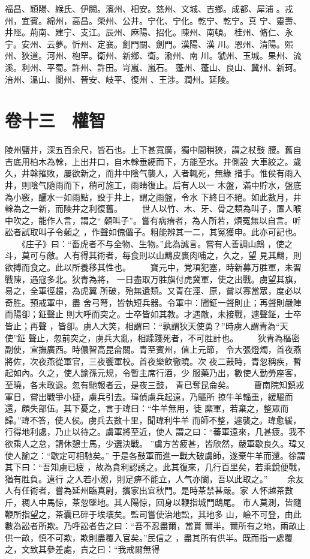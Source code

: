 \documentclass{ctexart}
\begin{document}
福昌、穎陽、緱氏、伊闕。濱州、相安。慈州、文城、吉鄉。成都、犀浦 。戎州，宜賓。綿州，高昌。榮州、公井。宁化、宁化。乾宁、乾宁。真 宁、靈壽、井陘。荊南、建宁、支江。辰州、麻陽、招化。陳州、南頓。 桂州、脩仁、永宁。安州、云夢。忻州、定襄。劍門關、劍門。漢陽、漢 川。恩州、清陽。熙州、狄道。河州、枹罕。衛州、新鄉、衛。渝州、南 川。虢州、玉城。果州、流溪。利州、平蜀。許州、許田。岢嵐、嵐石。 蓬州、蓬山、良山、冀州、新珂。涪州、溫山、閬州、晉安、岐平、復州 、王涉。潤州。延陵。
\clearpage
\section{卷十三　權智}
\paragraph{}
陵州鹽井，深五百余尺，皆石也。上下甚寬廣，獨中間稍狹，謂之杖鼓 腰。舊自吉底用柏木為榦，上出井口，自木榦垂綆而下，方能至水。井側設 大車絞之。歲久，井榦摧敗，屢欲新之，而井中陰气襲人，入者輒死，無緣 措手。惟侯有雨入井，則陰气隨雨而下，稍可施工，雨睛復止。后有人以一 木盤，滿中貯水，盤底為小竅，釃水一如雨點，設于井上，謂之雨盤，令水 下終日不絕。如此數月，井榦為之一新，而陵井之利復舊。 　　世人以竹、木、牙、骨之類為叫子，置人喉中吹之，能作人言，謂之`` 顙叫子''。嘗有病瘖者，為人所若，煩冤無以自言。听訟者試取叫子令顙之 ，作聲如傀儡子。粗能辨其一二，其冤獲申。此亦可記也。 　　《庄子》曰：``畜虎者不与全物、生物。''此為誠言。嘗有人善調山鷓 ，使之斗，莫可与敵。人有得其術者，每食則以山鷓皮裹肉哺之，久之，望 見其鷓，則欲搏而食之。此以所養移其性也。 　　寶元中，党項犯塞，時新募万胜軍，未習戰陳，遇寇多北。狄青為將， 一日盡取万胜旗付虎冀軍，使之出戰。虜望其旗，易之，全軍徑趨，為虎翼 所破，殆無遺類。又青在涇、原，嘗以寡當眾，度必以奇胜。預戒軍中，盡 舍弓弩，皆執短兵器。令軍中：聞鉦一聲則止；再聲則嚴陣而陽卻；鉦聲止 則大呼而突之。士卒皆如其教。才遇敵，未接戰，遽聲鉦，士卒皆止；再聲 ，皆卻。虜人大笑，相謂曰：``孰謂狄天使勇？''時虜人謂青為``天使''鉦 聲止，忽前突之，虜兵大亂，相蹂踐死者，不可胜計也。 　　狄青為樞密副使，宣撫廣西。時儂智高昆侖關。青至賓州，值上元節， 令大張燈燭，首夜燕將佐，次夜燕從軍官，三夜饗軍校。首夜樂飲徹曉。次 夜二鼓時，青忽稱疾，暫起如內。久之，使人諭孫元規，令暫主席行酒，少 服藥乃出，數使人勤勞座客，至曉，各未敢退。忽有馳報者云，是夜三鼓， 青已奪昆侖矣。 　　曹南院知鎮戎軍日，嘗出戰爭小捷，虜兵引去。瑋偵虜兵起遠，乃驅所 掠牛羊輜重，緩驅而還，頗失部伍。其下憂之，言于瑋曰：``牛羊無用，徒 縻軍，若棄之，整眾而歸。''瑋不答，使人侯。虜兵去數十里，聞瑋利牛羊 而師不整，遽襲之。瑋愈緩，行得地利處，乃止以待之。虜軍將至近，使人 謂之曰：``蕃軍遠來，几甚疲。我不欲乘人之怠，請休憩士馬，少選決戰。 ''虜方苦疲甚，皆欣然，嚴軍歇良久。瑋又使人諭之：``歇定可相馳矣。'' 于是各鼓軍而進一戰大破虜師，遂棄牛羊而還。徐謂其下曰：``吾知虜已疲 ，故為貪利認誘之。此其復來，几行百里矣，若乘銳便戰，猶有胜負。遠行 之人若小憩，則足痹不能立，人气亦闌，吾以此取之。'' 　　余友人有任術者，嘗為延州臨真尉，攜家出宜秋門。是時茶禁甚嚴。家 人怀越茶數斤，稠人中馬惊，茶忽墜地。其人陽惊，回身以鞭指城門鴟尾。 市人莫測，皆隨鞭所指望之，茶囊已碎于埃壤矣。監司嘗使治地訟，其地多 山，嶮不可登，由此數為訟者所欺。乃呼訟者告之曰：``吾不忍盡爾，當貰 爾半。爾所有之地，兩畝止供一畝，慎不可欺，欺則盡覆入官矣。''民信之 ，盡其所有供半。既而指一處覆之，文致其參差處，責之曰：``我戒爾無得 
\end{document}
